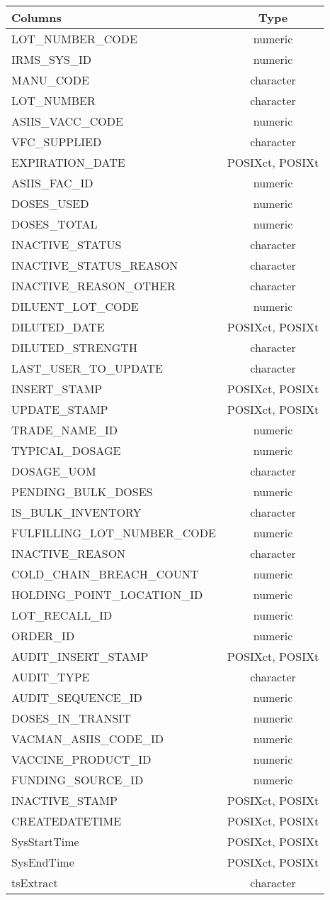 \documentclass[
  letterpaper,
  DIV=11,
  numbers=noendperiod]{scrreprt}
\begin{document}
\begin{longtable}{lc}
\toprule
Columns & Type \\ 
\midrule
LOT\_NUMBER\_CODE & numeric \\ 
IRMS\_SYS\_ID & numeric \\ 
MANU\_CODE & character \\ 
LOT\_NUMBER & character \\ 
ASIIS\_VACC\_CODE & numeric \\ 
VFC\_SUPPLIED & character \\ 
EXPIRATION\_DATE & POSIXct, POSIXt \\ 
ASIIS\_FAC\_ID & numeric \\ 
DOSES\_USED & numeric \\ 
DOSES\_TOTAL & numeric \\ 
INACTIVE\_STATUS & character \\ 
INACTIVE\_STATUS\_REASON & character \\ 
INACTIVE\_REASON\_OTHER & character \\ 
DILUENT\_LOT\_CODE & numeric \\ 
DILUTED\_DATE & POSIXct, POSIXt \\ 
DILUTED\_STRENGTH & character \\ 
LAST\_USER\_TO\_UPDATE & character \\ 
INSERT\_STAMP & POSIXct, POSIXt \\ 
UPDATE\_STAMP & POSIXct, POSIXt \\ 
TRADE\_NAME\_ID & numeric \\ 
TYPICAL\_DOSAGE & numeric \\ 
DOSAGE\_UOM & character \\ 
PENDING\_BULK\_DOSES & numeric \\ 
IS\_BULK\_INVENTORY & character \\ 
FULFILLING\_LOT\_NUMBER\_CODE & numeric \\ 
INACTIVE\_REASON & character \\ 
COLD\_CHAIN\_BREACH\_COUNT & numeric \\ 
HOLDING\_POINT\_LOCATION\_ID & numeric \\ 
LOT\_RECALL\_ID & numeric \\ 
ORDER\_ID & numeric \\ 
AUDIT\_INSERT\_STAMP & POSIXct, POSIXt \\ 
AUDIT\_TYPE & character \\ 
AUDIT\_SEQUENCE\_ID & numeric \\ 
DOSES\_IN\_TRANSIT & numeric \\ 
VACMAN\_ASIIS\_CODE\_ID & numeric \\ 
VACCINE\_PRODUCT\_ID & numeric \\ 
FUNDING\_SOURCE\_ID & numeric \\ 
INACTIVE\_STAMP & POSIXct, POSIXt \\ 
CREATEDATETIME & POSIXct, POSIXt \\ 
SysStartTime & POSIXct, POSIXt \\ 
SysEndTime & POSIXct, POSIXt \\ 
tsExtract & character \\ 
\bottomrule
\end{longtable}
\end{document}
